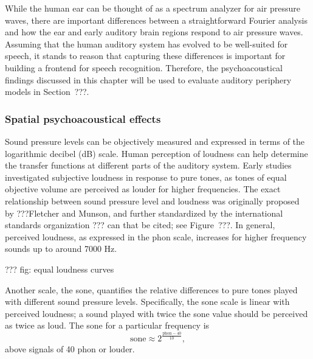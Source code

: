 While the human ear can be thought of
as a spectrum analyzer for air pressure waves,
there are important differences between
a straightforward Fourier analysis
and how the ear and early auditory brain regions
respond to air pressure waves.
Assuming that the human
auditory system has evolved to be
well-suited for speech,
it stands to reason that
capturing these differences
is important for building
a frontend for speech recognition.
Therefore, the psychoacoustical findings
discussed in this chapter will be
used to evaluate auditory periphery models
in Section~???.

\subsubsection{Spatial psychoacoustical effects}

Sound pressure levels can be objectively measured
and expressed in terms of the logarithmic
decibel (dB) scale.
Human perception of loudness can help
determine the transfer functions
at different parts of the auditory system.
Early studies investigated
subjective loudness in response
to pure tones,
as tones of equal objective volume
are perceived as louder for higher frequencies.
The exact relationship between
sound pressure level and
loudness was originally proposed
by ???Fletcher and Munson,
and further standardized
by the international standards organization
??? can that be cited;
see Figure~???.
In general, perceived loudness,
as expressed in the phon scale,
increases for higher frequency sounds
up to around 7000 Hz.

??? fig: equal loudness curves

Another scale, the sone,
quantifies the relative differences
to pure tones played with
different sound pressure levels.
Specifically, the sone scale
is linear with perceived loudness;
a sound played with twice the sone value
should be perceived as twice as loud.
The sone for a particular frequency is
$$\text{sone} \approx 2^{\frac{\text{phon} - 40}{10}},$$
above signals of 40 phon or louder.

